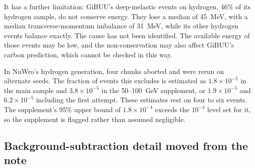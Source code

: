 It has a further limitation: GiBUU's deep-inelastic events on hydrogen, 46\% of its hydrogen sample, do not conserve energy.  They lose a median of \SI{45}{MeV}, with a median transverse-momentum imbalance of \SI{31}{MeV}, while its other hydrogen events balance exactly. The cause has not been identified. The available energy of those events may be low, and the non-conservation may also affect GiBUU's carbon prediction, which cannot be checked in this way.

In NuWro's hydrogen generation, four chunks aborted and were rerun on alternate seeds. The fraction of events this excludes is estimated as $1.8\times10^{-5}$ in the main sample and $3.8\times10^{-5}$ in the 50--\SI{100}{GeV} supplement, or $1.9\times10^{-5}$ and $6.2\times10^{-5}$ including the first attempt. These estimates rest on four to six events.  The supplement's 95\% upper bound of $1.8\times10^{-4}$ exceeds the $10^{-4}$ level set for it, so the supplement is flagged rather than assumed negligible.

\subsection{Background-subtraction detail moved from the note}


